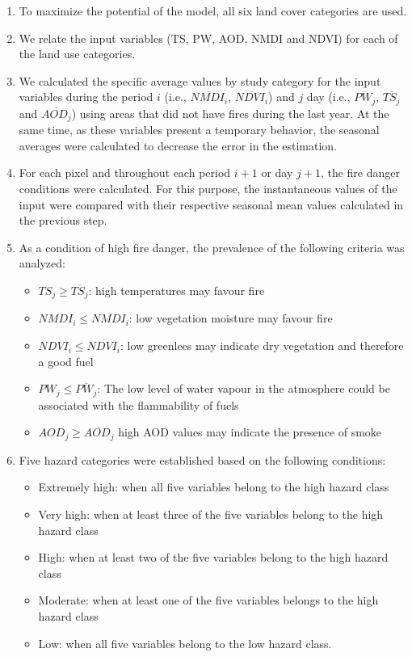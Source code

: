 \documentclass{article}
\begin{document}
\begin{enumerate}
    \item To maximize the potential of the model, all six land cover categories are used. 
    
    \item We relate the input variables (TS, PW, AOD, NMDI and NDVI) for each of the land use categories. 
    
    \item We calculated the specific average values by study category for the input variables during the period $i$ (i.e., $\overline{NMDI_i}$, $\overline{NDVI_i}$) and $j$ day (i.e., $\overline{PW_j}$, $\overline{TS_j}$ and $\overline{AOD_j}$) using areas that did not have fires during the last year. At the same time, as these variables present a temporary behavior, the seasonal averages were calculated to decrease the error in the estimation.
    
    \item For each pixel and throughout each period $i+1$ or day $j+1$, the fire danger conditions were calculated. For this purpose, the instantaneous values of the input were compared with their respective seasonal mean values calculated in the previous step.  
    
    \item As a condition of high fire danger, the prevalence of the following criteria was analyzed:
    
    \begin{itemize}
        \item $TS_j \geq \overline{TS_j} $: high temperatures may favour fire
        \item $ NMDI_i \leq \overline{NMDI_i} $: low vegetation moisture may favour fire
        \item $NDVI_i \leq \overline{NDVI_i}$: low greenlees may indicate dry vegetation and therefore a good fuel
        \item $PW_j \leq \overline{PW_j}$: The low level of water vapour in the atmosphere could be associated with the flammability of fuels
        \item $AOD_j \geq \overline{AOD_j}$ high AOD values may indicate the presence of smoke
    \end{itemize}
    
    \item Five hazard categories were established based on the following conditions: 
    
    \begin{itemize}
        \item Extremely high: when all five variables belong to the high hazard class
        \item Very high: when at least three of the five variables belong to the high hazard class 
        \item High: when at least two of the five variables belong to the high hazard class
        \item Moderate: when at least one of the five variables belongs to the high hazard class
        \item Low: when all five variables belong to the low hazard class.
    \end{itemize}
    

\end{enumerate}
\end{document}
